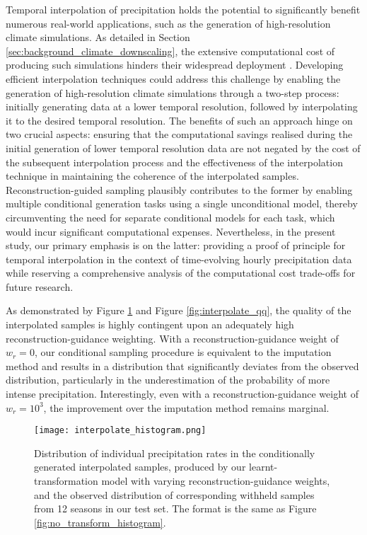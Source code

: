 \documentclass[ oneside,%
                    author={George Herbert},
                    degree={MSci},
                     title={Diffusion Models for Time-Evolving Precipitation Fields},
                  subtitle={}]{dissertation}
\begin{document}
Temporal interpolation of precipitation holds the potential to significantly benefit numerous real-world applications, such as the generation of high-resolution climate simulations. As detailed in Section \ref{sec:background_climate_downscaling}, the extensive computational cost of producing such simulations hinders their widespread deployment \cite{MO_CPM}. Developing efficient interpolation techniques could address this challenge by enabling the generation of high-resolution climate simulations through a two-step process: initially generating data at a lower temporal resolution, followed by interpolating it to the desired temporal resolution. The benefits of such an approach hinge on two crucial aspects: ensuring that the computational savings realised during the initial generation of lower temporal resolution data are not negated by the cost of the subsequent interpolation process and the effectiveness of the interpolation technique in maintaining the coherence of the interpolated samples. Reconstruction-guided sampling plausibly contributes to the former by enabling multiple conditional generation tasks using a single unconditional model, thereby circumventing the need for separate conditional models for each task, which would incur significant computational expenses. Nevertheless, in the present study, our primary emphasis is on the latter: providing a proof of principle for temporal interpolation in the context of time-evolving hourly precipitation data while reserving a comprehensive analysis of the computational cost trade-offs for future research.

As demonstrated by Figure \ref{fig:interpolate_histogram} and Figure \ref{fig:interpolate_qq}, the quality of the interpolated samples is highly contingent upon an adequately high reconstruction-guidance weighting. With a reconstruction-guidance weight of $w_r=0$, our conditional sampling procedure is equivalent to the imputation method \cite{Score_Based_Song} and results in a distribution that significantly deviates from the observed distribution, particularly in the underestimation of the probability of more intense precipitation. Interestingly, even with a reconstruction-guidance weight of $w_r=10^3$, the improvement over the imputation method remains marginal.

\begin{figure}[htbp]
      \centering
      \texttt{[image: interpolate\_histogram.png]}
      \caption{Distribution of individual precipitation rates in the conditionally generated interpolated samples, produced by our learnt-transformation model with varying reconstruction-guidance weights, and the observed distribution of corresponding withheld samples from 12 seasons in our test set. The format is the same as Figure \ref{fig:no_transform_histogram}.}
      \label{fig:interpolate_histogram}
\end{figure}
\end{document}
